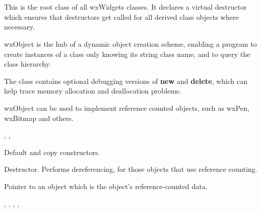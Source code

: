 \section{}\label{wxobject}

This is the root class of all wxWidgets classes.
It declares a virtual destructor which ensures that
destructors get called for all derived class objects where necessary.

wxObject is the hub of a dynamic object creation
scheme, enabling a program to create instances of a class only knowing
its string class name, and to query the class hierarchy.

The class contains optional debugging versions
of {\bf new} and {\bf delete}, which can help trace memory allocation
and deallocation problems.

wxObject can be used to implement reference counted objects, such as
wxPen, wxBitmap and others.


, ,\rtfsp
{}


\label{wxobjectctor}



Default and copy constructors.

\label{wxobjectdtor}


Destructor. Performs dereferencing, for those objects
that use reference counting.

\label{wxobjectmrefdata}


Pointer to an object which is the object's reference-counted data.


, ,\rtfsp
{},\rtfsp
{},\rtfsp
{}

\label{wxobjectdump}

